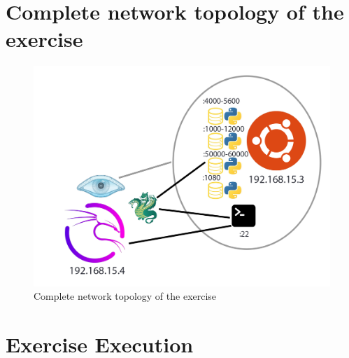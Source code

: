 \documentclass[a4paper]{article}
\newcommand{\abc}{\hfill \break}
\begin{document}
\section{Complete network topology of the exercise}
\begin{figure}[h]
	\includegraphics[scale=0.3]{./images/topo.png}
	\centering
	\caption{Complete network topology of the exercise}
\end{figure}\abc

\newpage

\section{Exercise Execution}
\end{document}
